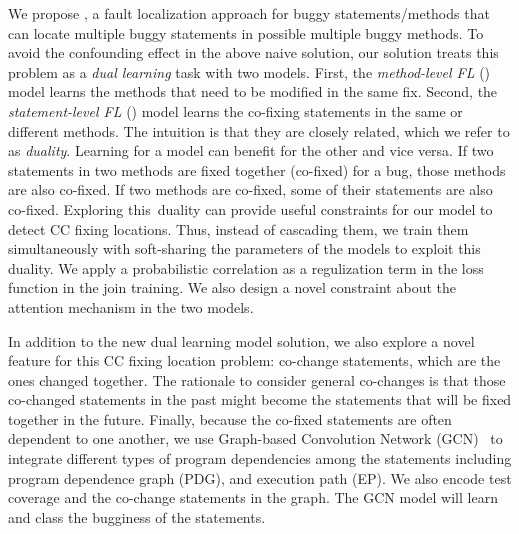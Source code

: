 We propose {\tool}, a fault localization approach for buggy
statements/methods that can locate multiple buggy statements in
possible multiple buggy methods. To avoid the confounding effect in
the above naive solution, our solution treats this problem as a {\em
  dual learning} task with two models. First, the {\em method-level
  FL} () model learns the methods that need to be
modified in the same fix. Second, the {\em statement-level FL}
() model learns the co-fixing statements in the same or
different methods. The intuition is that they are closely related,
which we refer to as {\em duality}. Learning for a model can benefit
for the other and vice versa. If two statements in two methods are
fixed together (co-fixed) for a bug, those methods are also
co-fixed. If two methods are co-fixed, some of their statements
are also co-fixed. Exploring this~duality can provide useful
constraints for our model to detect CC fixing locations. Thus,
instead of cascading them, we train them simultaneously with
soft-sharing the parameters of the models to exploit this
duality. We apply a probabilistic correlation as a regulization term
in the loss function in the join training. We also design a novel
constraint about the attention mechanism in the two models.

In addition to the new dual learning model solution, we also explore a
novel feature for this CC fixing location problem: co-change
statements, which are the ones changed together. The rationale to
consider general co-changes is that those co-changed statements in the
past might become the statements that will be fixed together in the
future. Finally, because the co-fixed statements are often dependent
to one another, we use Graph-based Convolution Network
(GCN)~\cite{li2019gcn} to integrate different types of program
dependencies among the statements including program dependence graph
(PDG), and execution path (EP). We also encode test coverage and the
co-change statements in the graph. The GCN model will learn and class
the bugginess of the statements.


